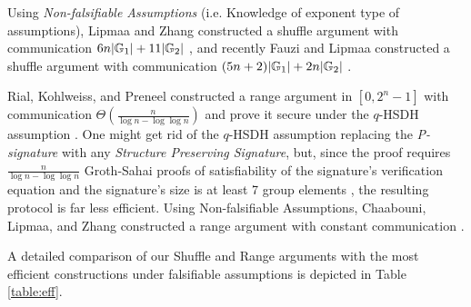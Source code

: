Using \emph{Non-falsifiable Assumptions} (i.e. Knowledge of exponent type of assumptions), Lipmaa and Zhang constructed a shuffle argument with communication $6n|\mathbb{G}_1|+11|\mathbb{G}_2|$ \cite{SCN:LipZha12}, and recently Fauzi and Lipmaa constructed a shuffle argument with communication $(5n+2)|\mathbb{G}_1|+2n|\mathbb{G}_2|$ \cite{EPRINT:FauLip15}.

Rial, Kohlweiss, and Preneel constructed a range argument in $[0,2^n-1]$ with communication $\Theta(\frac{n}{\log n -\log\log n})$ and prove it secure under the $q$-HSDH assumption \cite{PAIRING:RiaKohPre09}. One might get rid of the $q$-HSDH assumption replacing the \emph{P-signature} with any \emph{Structure Preserving Signature}, but, since the proof requires $\frac{n}{\log n-\log \log n}$ Groth-Sahai proofs of satisfiability of the signature's verification equation and the signature's size is at least 7 group elements \cite{C:KilPanWee15,C:LibPetYun15}, the resulting protocol is far less efficient.
Using Non-falsifiable Assumptions, Chaabouni, Lipmaa, and Zhang constructed a range argument with constant communication \cite{FC:ChaLipZha12}. 

A detailed comparison of our Shuffle and Range arguments with the most efficient constructions under falsifiable assumptions is depicted in Table \ref{table:eff}.



